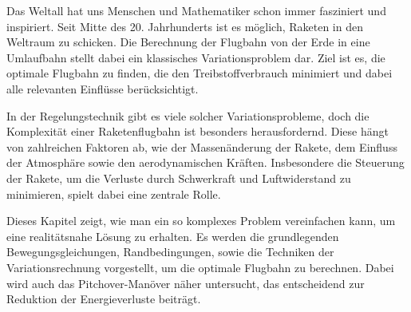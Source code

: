%
%
%
%

Das Weltall hat uns Menschen und Mathematiker schon immer fasziniert und inspiriert. 
Seit Mitte des 20. Jahrhunderts ist es möglich, Raketen in den Weltraum zu schicken. 
Die Berechnung der Flugbahn von der Erde in eine Umlaufbahn stellt dabei ein klassisches Variationsproblem dar. 
%
Ziel ist es, die optimale Flugbahn zu finden, die den Treibstoffverbrauch minimiert und dabei alle relevanten Einflüsse berücksichtigt.
%

In der Regelungstechnik gibt es viele solcher Variationsprobleme,
%
doch die Komplexität einer Raketenflugbahn ist besonders herausfordernd.
Diese hängt von zahlreichen Faktoren ab, wie der Massenänderung der
Rakete, dem Einfluss der Atmosphäre sowie den aerodynamischen
%
%
%
Kräften.
Insbesondere die Steuerung der Rakete, um die Verluste durch
Schwerkraft und Luftwiderstand zu minimieren, spielt dabei eine
%
zentrale Rolle.

Dieses Kapitel zeigt, wie man ein so komplexes Problem vereinfachen
kann, um eine realitätsnahe Lösung zu erhalten.
Es werden die grundlegenden Bewegungsgleichungen, Randbedingungen,
sowie die Techniken der Variationsrechnung vorgestellt, um die
optimale Flugbahn zu berechnen.
Dabei wird auch das Pitchover-Manöver näher untersucht, das
%
entscheidend zur Reduktion der Energieverluste beiträgt.

